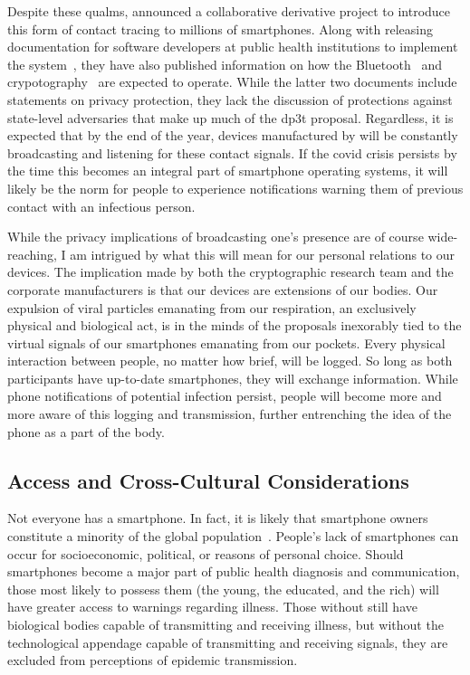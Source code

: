 \documentclass[2020/08/28 v2]{../../../coursework}
\begin{document}
Despite these qualms, \textcite{AppleCT.Announcement} announced a collaborative
derivative project to introduce this form of contact tracing to millions of
smartphones. Along with releasing documentation for software developers at public
health institutions to implement the system~\parencite*{AppleCT.API}, they have also
published information on how the Bluetooth~\parencite*{AppleCT.Bluetooth} and
crypotography~\parencite*{AppleCT.Crypto} are expected to operate.
While the latter two documents include statements on privacy protection, they lack
the discussion of protections against state-level adversaries that make up
much of the \ac{dp3t} proposal.
Regardless, it is expected that by the end of the year, devices manufactured by
\citeauthor{AppleCT.Announcement} will be constantly broadcasting and listening
for these contact signals. If the \ac{covid} crisis persists by the time this
becomes an integral part of smartphone operating systems, it will likely be the
norm for people to experience notifications warning them of previous contact
with an infectious person.

While the privacy implications of broadcasting one's presence are of course 
wide-reaching, I am intrigued by what this will mean for our personal relations
to our devices. The implication made by both the cryptographic research team
and the corporate manufacturers is that our devices are extensions of our bodies.
Our expulsion of viral particles emanating from our respiration, an exclusively physical and biological act,
is in the minds of the proposals inexorably tied to the virtual signals of our
smartphones emanating from our pockets. 
Every physical interaction between people, no matter how brief, will be logged.
So long as both participants have up-to-date smartphones, they will exchange
information. While phone notifications of potential infection persist, people
will become more and more aware of this logging and transmission, further
entrenching the idea of the phone as a part of the body.

\subsection{Access and Cross-Cultural Considerations}

Not everyone has a smartphone. In fact, it is likely that smartphone owners
constitute a minority of the global population~\parencite{pew.phone}.
People's lack of smartphones can occur for socioeconomic, political, or
reasons of personal choice. Should
smartphones become a major part of public health diagnosis and communication,
those most likely to possess them (the young, the educated, and the rich) will
have greater access to warnings regarding illness. 
Those without still have biological bodies capable of transmitting and receiving
illness, but without the technological appendage capable of transmitting and
receiving signals, they are excluded from perceptions of epidemic transmission.
\end{document}
